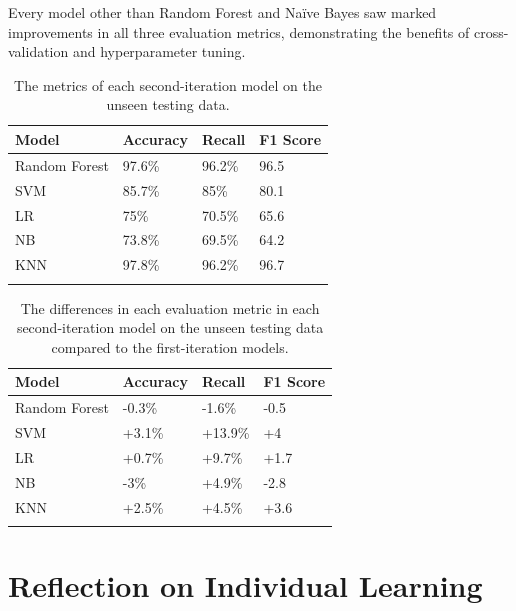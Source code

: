 \documentclass[12pt]{report}
\newcommand{\para}{\vspace{8pt}\noindent}
\begin{document}
\para Every model other than Random Forest and Na\"ive Bayes saw marked improvements in all three evaluation metrics, demonstrating the benefits of cross-validation 
and hyperparameter tuning.

\begin{longtable}{ | p{} | p{} | p{} | p{} | }
    \hline
    \cellcolor{blue!25} Model & \cellcolor{blue!25} Accuracy & \cellcolor{blue!25} Recall & \cellcolor{blue!25} F1 Score\\
    \hline
    Random Forest & 97.6\% & 96.2\% & 96.5\\
    \hline
    SVM & 85.7\% & 85\% & 80.1 \\
    \hline
    LR & 75\% & 70.5\% & 65.6\\
    \hline
    NB & 73.8\% & 69.5\% & 64.2\\
    \hline
    KNN & 97.8\% & 96.2\% & 96.7 \\
    \hline
    \caption{The metrics of each second-iteration model on the unseen testing data.}\label{tab:Iteration2Results}
\end{longtable}



\begin{longtable}{ | p{} | p{} | p{} | p{} | }
    \hline
    \cellcolor{blue!25} Model & \cellcolor{blue!25} Accuracy & \cellcolor{blue!25} Recall & \cellcolor{blue!25} F1 Score\\
    \hline
    Random Forest & \cellcolor{red!25} -0.3\% & \cellcolor{red!25}-1.6\% & \cellcolor{red!25} -0.5\\ 
    \hline
    SVM & \cellcolor{green!18}+3.1\% & \cellcolor{green!18}+13.9\% & \cellcolor{green!18}+4\\ 
    \hline
    LR & \cellcolor{green!18}+0.7\% & \cellcolor{green!18}+9.7\% & \cellcolor{green!18}+1.7\\
    \hline
    NB & \cellcolor{red!25}-3\% & \cellcolor{green!18}+4.9\% & \cellcolor{red!25}-2.8\\
    \hline
    KNN & \cellcolor{green!18}+2.5\% & \cellcolor{green!18}+4.5\% & \cellcolor{green!18}+3.6\\
    \hline
    \caption{The differences in each evaluation metric in each second-iteration model on the unseen testing data compared to the first-iteration models.}\label{tab:Improvements}
\end{longtable}

\pagebreak 
\section{Reflection on Individual Learning}
\end{document}
